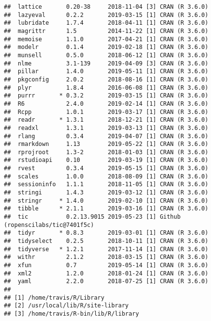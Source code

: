 \documentclass[]{book}
\begin{document}
\begin{verbatim}
##  lattice       0.20-38     2018-11-04 [3] CRAN (R 3.6.0)                   
##  lazyeval      0.2.2       2019-03-15 [1] CRAN (R 3.6.0)                   
##  lubridate     1.7.4       2018-04-11 [1] CRAN (R 3.6.0)                   
##  magrittr      1.5         2014-11-22 [1] CRAN (R 3.6.0)                   
##  memoise       1.1.0       2017-04-21 [1] CRAN (R 3.6.0)                   
##  modelr        0.1.4       2019-02-18 [1] CRAN (R 3.6.0)                   
##  munsell       0.5.0       2018-06-12 [1] CRAN (R 3.6.0)                   
##  nlme          3.1-139     2019-04-09 [3] CRAN (R 3.6.0)                   
##  pillar        1.4.0       2019-05-11 [1] CRAN (R 3.6.0)                   
##  pkgconfig     2.0.2       2018-08-16 [1] CRAN (R 3.6.0)                   
##  plyr          1.8.4       2016-06-08 [1] CRAN (R 3.6.0)                   
##  purrr       * 0.3.2       2019-03-15 [1] CRAN (R 3.6.0)                   
##  R6            2.4.0       2019-02-14 [1] CRAN (R 3.6.0)                   
##  Rcpp          1.0.1       2019-03-17 [1] CRAN (R 3.6.0)                   
##  readr       * 1.3.1       2018-12-21 [1] CRAN (R 3.6.0)                   
##  readxl        1.3.1       2019-03-13 [1] CRAN (R 3.6.0)                   
##  rlang         0.3.4       2019-04-07 [1] CRAN (R 3.6.0)                   
##  rmarkdown     1.13        2019-05-22 [1] CRAN (R 3.6.0)                   
##  rprojroot     1.3-2       2018-01-03 [1] CRAN (R 3.6.0)                   
##  rstudioapi    0.10        2019-03-19 [1] CRAN (R 3.6.0)                   
##  rvest         0.3.4       2019-05-15 [1] CRAN (R 3.6.0)                   
##  scales        1.0.0       2018-08-09 [1] CRAN (R 3.6.0)                   
##  sessioninfo   1.1.1       2018-11-05 [1] CRAN (R 3.6.0)                   
##  stringi       1.4.3       2019-03-12 [1] CRAN (R 3.6.0)                   
##  stringr     * 1.4.0       2019-02-10 [1] CRAN (R 3.6.0)                   
##  tibble      * 2.1.1       2019-03-16 [1] CRAN (R 3.6.0)                   
##  tic           0.2.13.9015 2019-05-23 [1] Github (ropenscilabs/tic@7401f5c)
##  tidyr       * 0.8.3       2019-03-01 [1] CRAN (R 3.6.0)                   
##  tidyselect    0.2.5       2018-10-11 [1] CRAN (R 3.6.0)                   
##  tidyverse   * 1.2.1       2017-11-14 [1] CRAN (R 3.6.0)                   
##  withr         2.1.2       2018-03-15 [1] CRAN (R 3.6.0)                   
##  xfun          0.7         2019-05-14 [1] CRAN (R 3.6.0)                   
##  xml2          1.2.0       2018-01-24 [1] CRAN (R 3.6.0)                   
##  yaml          2.2.0       2018-07-25 [1] CRAN (R 3.6.0)                   
## 
## [1] /home/travis/R/Library
## [2] /usr/local/lib/R/site-library
## [3] /home/travis/R-bin/lib/R/library
\end{verbatim}
\end{document}
